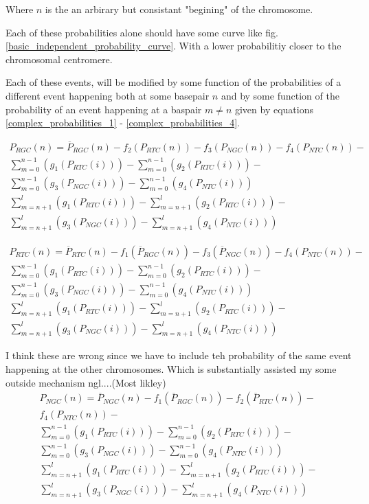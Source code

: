 \documentclass{article}
\begin{document}
        Where \(n\) is the an arbirary but consistant "begining" of the chromosome.  
        
        Each of these probabilities alone should have some curve like fig. \ref{basic_independent_probability_curve}.  With a lower probabilitiy closer to the chromosomal centromere.

        Each of these events, will be modified by some function of the probabilities of a different event happening both at some basepair \(n\) and by some function of the probability of an event happening at a baspair \(m \neq n\) given by equations \ref{complex_probabilities_1} - \ref{complex_probabilities_4}.

        \begin{multline}\label{complex_probabilities_1}
            {P}_{RGC}(n) = \overline{P}_{RGC}(n)- f_2(P_{RTC}(n)) - f_3(P_{NGC}(n)) - f_4(P_{NTC}(n)) - \\ \sum_{m = 0}^{n-1}(g_1(P_{RTC}(i))) - \sum_{m = 0}^{n-1}(g_2(P_{RTC}(i))) - \\ \sum_{m = 0}^{n-1}(g_3(P_{NGC}(i))) - \sum_{m = 0}^{n-1}(g_4(P_{NTC}(i))) \\
            \sum_{m = n+1}^{l}(g_1(P_{RTC}(i))) - \sum_{m = n+1}^{l}(g_2(P_{RTC}(i))) - \\ \sum_{m = n+1}^{l}(g_3(P_{NGC}(i))) - \sum_{m = n+1}^{l}(g_4(P_{NTC}(i))) 
        \end{multline}

        \begin{multline}\label{complex_probabilities_2}
            {P}_{RTC}(n) = \overline{P}_{RTC}(n) - f_1(\overline{P}_{RGC}(n)) - f_3(\overline{P}_{NGC}(n)) - f_4(P_{NTC}(n)) - \\ \sum_{m = 0}^{n-1}(g_1(P_{RTC}(i))) - \sum_{m = 0}^{n-1}(g_2(P_{RTC}(i))) - \\ \sum_{m = 0}^{n-1}(g_3(P_{NGC}(i))) - \sum_{m = 0}^{n-1}(g_4(P_{NTC}(i))) \\ \sum_{m = n+1}^{l}(g_1(P_{RTC}(i))) - \sum_{m = n+1}^{l}(g_2(P_{RTC}(i))) - \\ \sum_{m = n+1}^{l}(g_3(P_{NGC}(i))) - \sum_{m = n+1}^{l}(g_4(P_{NTC}(i))) 
        \end{multline}


        I think these are wrong since we have to include teh probability of the same event happening at the other chromosomes.   Which is substantially assisted my some outside mechanism ngl....(Most likley)
        \begin{multline}\label{complex_probabilities_3}
            {P}_{NGC}(n) = \overline{P}_{NGC}(n) - f_1(\overline{P}_{RGC}(n)) - f_2(\overline{P}_{RTC}(n)) - \\ f_4(P_{NTC}(n)) - \\ \sum_{m = 0}^{n-1}(g_1(P_{RTC}(i))) - \sum_{m = 0}^{n-1}(g_2(P_{RTC}(i))) - \\ \sum_{m = 0}^{n-1}(g_3(P_{NGC}(i))) - \sum_{m = 0}^{n-1}(g_4(P_{NTC}(i))) \\ \sum_{m = n+1}^{l}(g_1(P_{RTC}(i))) - \sum_{m = n+1}^{l}(g_2(P_{RTC}(i))) - \\ \sum_{m = n+1}^{l}(g_3(P_{NGC}(i))) - \sum_{m = n+1}^{l}(g_4(P_{NTC}(i))) 
        \end{multline}
\end{document}
